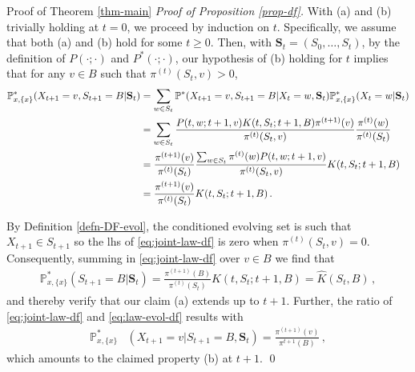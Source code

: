 \documentclass[12pt,reqno]{amsart}
\numberwithin{equation}{section}
\theoremstyle{definition}
\begin{document}
\begin{section}{Proof of Theorem \ref{thm-main}}
\bigskip
\noindent
\emph{Proof of Proposition \ref{prop-df}.}
With (a) and (b) trivially holding at $t=0$, we proceed by induction on $t$. 
Specifically, we assume that both (a) and (b) hold for some $t \ge 0$.
Then, with $\mathbf{S}_t=(S_0,\ldots,S_t)$, by the definition of 
$P(\cdot;\cdot)$ and $P^*(\cdot;\cdot)$, our 
hypothesis of (b) holding for $t$ implies that
for any $v \in B$ such that $\pi^{(t)}(S_t,v)>0$, 
\begin{align}
\mathbb{P}^*_{x,\{x\}} (X_{t+1}=v, S_{t+1}=B|\mathbf{S}_t)
&=\sum_{w\in S_t}\mathbb{P}^*(X_{t+1}=v, S_{t+1}=B|X_t=w,\mathbf{S}_t)\mathbb{P}^*_{x,\{x\}}(X_t=w|\mathbf{S}_t) \notag \\
&=\sum_{w\in S_t}\frac{P(t,w;t+1,v)K(t,S_t;t+1,B)\pi^{(t+1)}(v)}{\pi^{(t)}(S_t,v)}\frac{\pi^{(t)}(w)}{\pi^{(t)}(S_t)}  \notag \\
&=\frac{\pi^{(t+1)}(v)}{\pi^{(t)}(S_t)}\frac{\sum_{w\in S_t}\pi^{(t)}(w)P(t,w;t+1,v)}{\pi^{(t)}(S_t,v)}K(t,S_t;t+1,B) \notag \\
&=\frac{\pi^{(t+1)}(v)}{\pi^{(t)}(S_t)}K(t,S_t;t+1,B)\,.
\label{eq:joint-law-df}
\end{align}

By Definition \ref{defn-DF-evol}, the conditioned evolving set is such 
that $X_{t+1} \in S_{t+1}$ so
the {{\sc\lowercase{{lhs}}}} of \eqref{eq:joint-law-df} is zero when $\pi^{(t)}(S_t,v)=0$.
Consequently, summing in \eqref{eq:joint-law-df} over $v\in B$ we find that
\begin{align}\label{eq:law-evol-df}
\mathbb{P}^*_{x,\{x\}}(S_{t+1}=B|\mathbf{S}_t)
=\frac{\pi^{(t+1)}(B)}{\pi^{(t)}(S_t)}K(t,S_t;t+1,B) = \widehat{K}(S_t,B)\,,
\end{align}
and thereby verify that our claim (a) extends up to $t+1$. Further, 
the ratio of \eqref{eq:joint-law-df} and \eqref{eq:law-evol-df} 
results with  
\begin{align*}
\mathbb{P}^*_{x,\{x\}}&(X_{t+1}=v | S_{t+1}=B, \mathbf{S}_t)=\frac{\pi^{(t+1)}(v)}{\pi^{t+1}(B)} \,,
\end{align*}
which amounts to the claimed property (b) at $t+1$.
\qed

\end{section}
\end{document}
